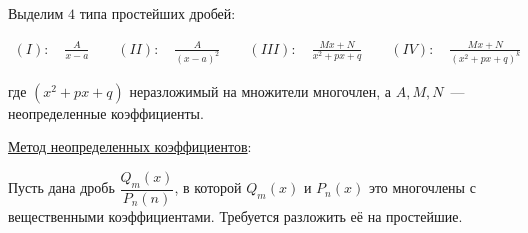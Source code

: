 
Выделим \(4\) типа простейших дробей:

\begin{align*}
  (I): \quad \frac{A}{x - a} \qquad
  (II): \quad \frac{A}{(x - a)^2} \qquad
  (III): \quad \frac{Mx + N}{x^2 + px + q} \qquad
  (IV): \quad \frac{Mx + N}{(x^2 + px + q)^{k}} \qquad
\end{align*}

где \((x^2 + px + q)\) неразложимый на множители многочлен, а \(A, M, N\)~---
неопределенные коэффициенты.

\underline{Метод неопределенных коэффициентов}:

Пусть дана дробь \(\dfrac{Q_{m}(x)}{P_{n}(n)}\), в которой \(Q_{m}(x)\) и
\(P_{n}(x)\) это многочлены с вещественными коэффициентами. Требуется
разложить её на простейшие.

